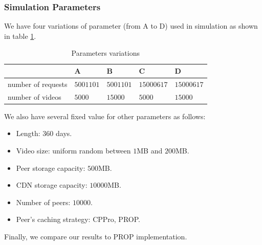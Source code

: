 \documentclass[10pt,final,journal,a4paper]{IEEEtran}
\begin{document}




\subsubsection{Simulation Parameters}
We have four variations of parameter (from A to D) used in simulation as shown in table \ref{tab:parameters}.
\begin{table}[!t]
\caption{Parameters variations}
\label{tab:parameters}
\centering

\begin{tabular}{|l|l|l|l|l|}
\hline
  & A & B & C & D \\ \hline
number of requests & $5001101$ & $5001101$ & $15000617$ & $15000617$ \\ \hline
number of videos  & $5000$ & $15000$ & $5000$ & $15000$ \\ \hline
\end{tabular}
\end{table}

We also have several fixed value for other parameters as follows: 
\begin{itemize}
\item Length: $360$ days.
\item Video size: uniform random between $1$MB and $200$MB.
\item Peer storage capacity: $500$MB.
\item CDN storage capacity: $10000$MB.
\item Number of peers: $10000$.
\item Peer's caching strategy: CPPro, PROP.
\end{itemize}
Finally, we compare our results to PROP \cite{1613869} implementation.
\end{document}
